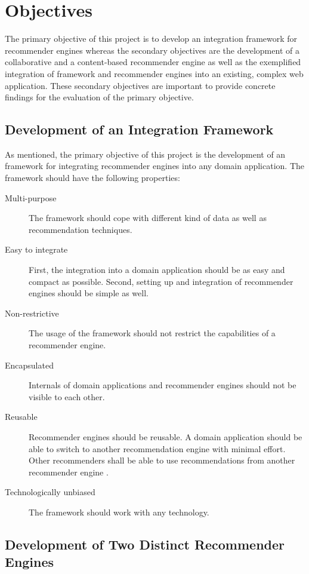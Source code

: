 \section{Objectives}
\label{intro-objectives}

The primary objective of this project is to develop an integration framework for recommender engines whereas the secondary objectives are the development of a collaborative and a content-based recommender engine as well as the exemplified integration of framework and recommender engines into an existing, complex web application. These secondary objectives are important to provide concrete findings for the evaluation of the primary objective.

\subsection{Development of an Integration Framework}
\label{intro-objectives-framework}

As mentioned, the primary objective of this project is the development of an framework for integrating recommender engines into any domain application. The framework should have the following properties:

\begin{description}
    \item[Multi-purpose] The framework should cope with different kind of data as well as recommendation techniques.
    \item[Easy to integrate] First, the integration into a domain application should be as easy and compact as possible. Second, setting up and integration of recommender engines should be simple as well.
    \item[Non-restrictive] The usage of the framework should not restrict the capabilities of a recommender engine.
    \item[Encapsulated] Internals of domain applications and recommender engines should not be visible to each other.
    \item[Reusable] Recommender engines should be reusable. A domain application should be able to switch to another recommendation engine with minimal effort. Other recommenders shall be able to use recommendations from another recommender engine \cite{manouselis07}.
    \item[Technologically unbiased] The framework should work with any technology.
\end{description}

\subsection{Development of Two Distinct Recommender Engines}
\label{intro-objectives-engines}

